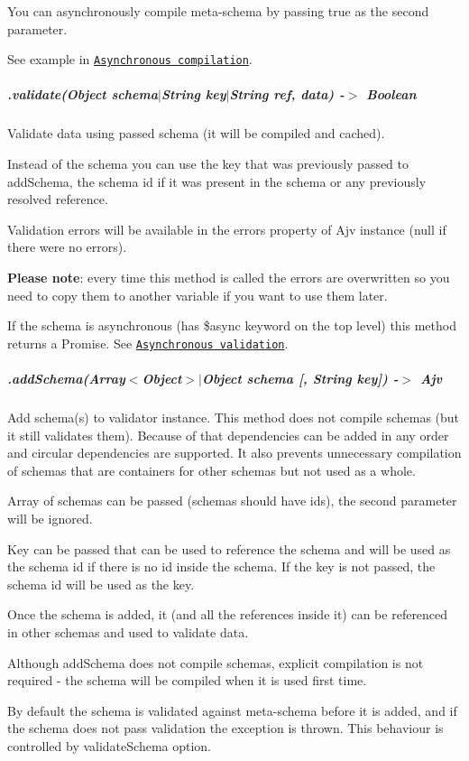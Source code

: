 You can asynchronously compile meta-\/schema by passing {\ttfamily true} as the second parameter.

See example in \href{#asynchronous-schema-compilation}{\tt Asynchronous compilation}.

\subparagraph*{.validate(Object schema$\vert$\+String key$\vert$\+String ref, data) -\/$>$ Boolean}

Validate data using passed schema (it will be compiled and cached).

Instead of the schema you can use the key that was previously passed to {\ttfamily add\+Schema}, the schema id if it was present in the schema or any previously resolved reference.

Validation errors will be available in the {\ttfamily errors} property of Ajv instance ({\ttfamily null} if there were no errors).

{\bfseries Please note}\+: every time this method is called the errors are overwritten so you need to copy them to another variable if you want to use them later.

If the schema is asynchronous (has {\ttfamily \$async} keyword on the top level) this method returns a Promise. See \href{#asynchronous-validation}{\tt Asynchronous validation}.

\subparagraph*{.add\+Schema(Array$<$Object$>$$\vert$\+Object schema \mbox{[}, String key\mbox{]}) -\/$>$ Ajv}

Add schema(s) to validator instance. This method does not compile schemas (but it still validates them). Because of that dependencies can be added in any order and circular dependencies are supported. It also prevents unnecessary compilation of schemas that are containers for other schemas but not used as a whole.

Array of schemas can be passed (schemas should have ids), the second parameter will be ignored.

Key can be passed that can be used to reference the schema and will be used as the schema id if there is no id inside the schema. If the key is not passed, the schema id will be used as the key.

Once the schema is added, it (and all the references inside it) can be referenced in other schemas and used to validate data.

Although {\ttfamily add\+Schema} does not compile schemas, explicit compilation is not required -\/ the schema will be compiled when it is used first time.

By default the schema is validated against meta-\/schema before it is added, and if the schema does not pass validation the exception is thrown. This behaviour is controlled by {\ttfamily validate\+Schema} option.

